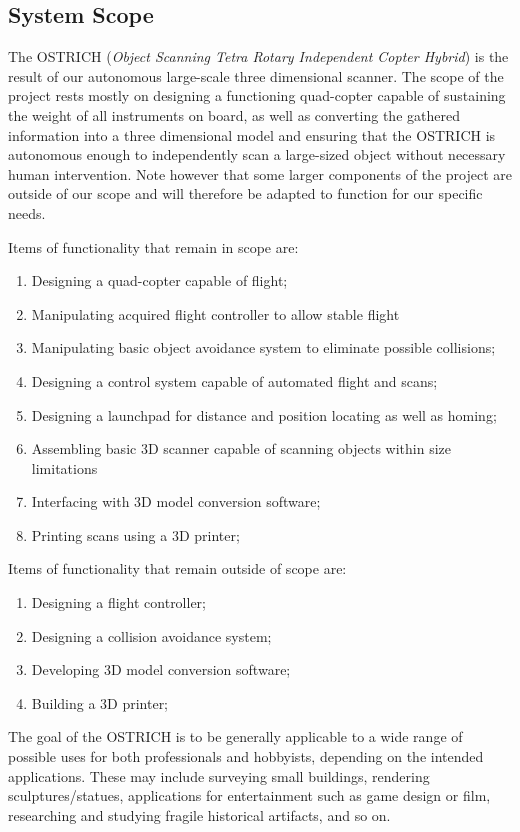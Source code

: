 \documentclass[10pt,letterpaper]{article}
\begin{document}
\subsection{System Scope}
The OSTRICH (\textit{Object Scanning Tetra Rotary Independent Copter Hybrid}) is the result of our autonomous large-scale three dimensional scanner. The scope of the project rests mostly on designing a functioning quad-copter capable of sustaining the weight of all instruments on board, as well as converting the gathered information into a three dimensional model and ensuring that the OSTRICH is autonomous enough to independently scan a large-sized object without necessary human intervention. Note however that some larger components of the project are outside of our scope and will therefore be adapted to function for our specific needs. \par 
Items of functionality that remain in scope are: 
\begin{enumerate}
	\item Designing a quad-copter capable of flight;
    \item Manipulating acquired flight controller to allow stable flight
    \item Manipulating basic object avoidance system to eliminate possible collisions;
    \item Designing a control system capable of automated flight and scans; 
    \item Designing a launchpad for distance and position locating as well as homing;
    \item Assembling basic 3D scanner capable of scanning objects within size limitations
    \item Interfacing with 3D model conversion software;
    \item Printing scans using a 3D printer;
\end{enumerate}
Items of functionality that remain outside of scope are:
\begin{enumerate}
	\item Designing a flight controller;
    \item Designing a collision avoidance system;
    \item Developing 3D model conversion software;
    \item Building a 3D printer;
\end{enumerate}
The goal of the OSTRICH is to be generally applicable to a wide range of possible uses for both professionals and hobbyists, depending on the intended applications. These may include surveying small buildings, rendering sculptures/statues, applications for entertainment such as game design or film, researching and studying fragile historical artifacts, and so on. 
\end{document}
